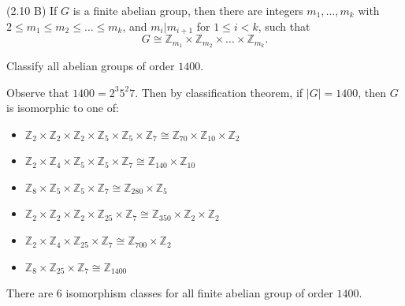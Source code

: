 \begin{corollary}
	(2.10 B)
	If $G$ is a finite abelian group, then there are integers $m_1, \ldots, m_k$ with $2 \le m_1 \le  m_2 \le  \ldots \le  m_k$, and $m_i | m_{i+1}$ for $1\le i<k$, such that \[
		G \cong \mathbb{Z}_{m_1} \times \mathbb{Z}_{m_2} \times \ldots \times \mathbb{Z}_{m_k}
	.\] 
\end{corollary}

\begin{example}
	Classify all abelian groups of order $1400$.

	Observe that $1400 = 2^3 5^2 7$. Then by classification theorem, if $|G| = 1400$, then $G$ is isomorphic to one of:
	\begin{itemize}
		\item $\mathbb{Z}_2 \times \mathbb{Z}_2 \times \mathbb{Z}_2 \times \mathbb{Z}_5 \times \mathbb{Z}_5 \times \mathbb{Z}_7 \cong \mathbb{Z}_{70} \times \mathbb{Z}_{10} \times \mathbb{Z}_2$
		\item $\mathbb{Z}_2 \times \mathbb{Z}_4 \times \mathbb{Z}_5 \times \mathbb{Z}_5 \times \mathbb{Z}_7 \cong \mathbb{Z}_{140} \times \mathbb{Z}_{10}$ 
		\item $\mathbb{Z}_8 \times \mathbb{Z}_5 \times \mathbb{Z}_5 \times \mathbb{Z}_7 \cong \mathbb{Z}_{280}\times \mathbb{Z}_5$
		\item $\mathbb{Z}_2 \times \mathbb{Z}_2 \times \mathbb{Z}_2 \times \mathbb{Z}_{25} \times \mathbb{Z}_7\cong \mathbb{Z}_{350} \times \mathbb{Z}_2 \times \mathbb{Z}_2$ 
		\item $\mathbb{Z}_2 \times \mathbb{Z}_4 \times \mathbb{Z}_{25} \times \mathbb{Z}_7 \cong \mathbb{Z}_{700} \times \mathbb{Z}_2$
		\item $\mathbb{Z}_8 \times \mathbb{Z}_{25} \times \mathbb{Z}_7 \cong \mathbb{Z}_{1400}$
	\end{itemize}
	There are $6 $ isomorphism classes for all finite abelian group of order $1400$.
\end{example}
